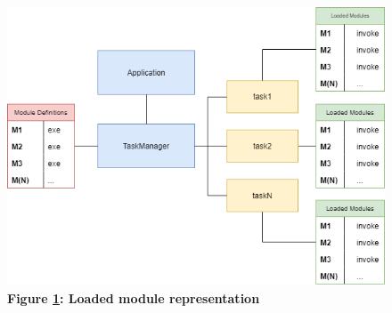 \begin{figure}[H]
    \centering
    \begin{mdframed}
        \centering
        \includegraphics[scale=0.62]{./resources/figures/fig-module-memory.png}
    \end{mdframed}
    \caption[Loaded module representation]{\textbf{Figure \ref{fig-module-memory}: Loaded module representation}}
    \label{fig-module-memory}
\end{figure}